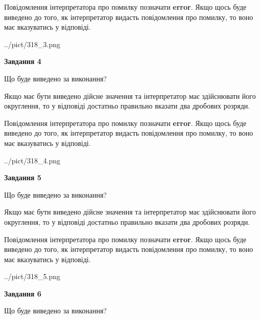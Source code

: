 \documentclass[12pt, ukrainian]{article}
\begin{document}
{\begin {Large}
Повідомлення інтерпретатора про помилку позначати \textbf{error}.
Якщо щось буде виведено до того, як інтерпретатор видасть повідомлення про помилку, 
то воно має вказуватись у відповіді. \par

\begin{center}
	{../pict/318_3.png}
\end{center}
\newpage

{\begin {center}\textbf{Завдання 4}\end {center}}\par
Що буде виведено за виконання? \par

Якщо має бути виведено дійсне значення та інтерпретатор має здійснювати його округлення, 
то у відповіді достатньо правильно вказати два дробових розряди.

Повідомлення інтерпретатора про помилку позначати \textbf{error}.
Якщо щось буде виведено до того, як інтерпретатор видасть повідомлення про помилку, 
то воно має вказуватись у відповіді. \par

\begin{center}
	{../pict/318_4.png}
\end{center}
\newpage

{\begin {center}\textbf{Завдання 5}\end {center}}\par
Що буде виведено за виконання? \par

Якщо має бути виведено дійсне значення та інтерпретатор має здійснювати його округлення, 
то у відповіді достатньо правильно вказати два дробових розряди.

Повідомлення інтерпретатора про помилку позначати \textbf{error}.
Якщо щось буде виведено до того, як інтерпретатор видасть повідомлення про помилку, 
то воно має вказуватись у відповіді. \par

\begin{center}
	{../pict/318_5.png}
\end{center}
\newpage

{\begin {center}\textbf{Завдання 6}\end {center}}\par
Що буде виведено за виконання? \par


\end{Large}}
\end{document}
